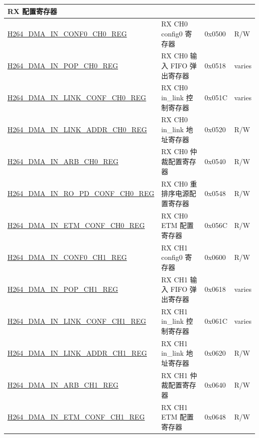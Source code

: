 \begin{longtable}{ | p{7.5cm} | p{5.7cm} | p{1.2cm} | p{1cm} | }
\multicolumn{4}{|l|}{\textbf{RX 配置寄存器}} \\ \hline
    \hyperref[regdesc:H264DMAINCONF0CH0REG]{H264\_DMA\_IN\_CONF0\_CH0\_REG} & RX CH0 config0 寄存器 & 0x0500 & R/W \\ \hline
    \hyperref[regdesc:H264DMAINPOPCH0REG]{H264\_DMA\_IN\_POP\_CH0\_REG} & RX CH0 输入 FIFO 弹出寄存器 & 0x0518 & varies \\ \hline
    \hyperref[regdesc:H264DMAINLINKCONFCH0REG]{H264\_DMA\_IN\_LINK\_CONF\_CH0\_REG} & RX CH0 in\_link 控制寄存器 & 0x051C & varies \\ \hline
    \hyperref[regdesc:H264DMAINLINKADDRCH0REG]{H264\_DMA\_IN\_LINK\_ADDR\_CH0\_REG} & RX CH0 in\_link 地址寄存器 & 0x0520 & R/W \\ \hline
    \hyperref[regdesc:H264DMAINARBCH0REG]{H264\_DMA\_IN\_ARB\_CH0\_REG} & RX CH0 仲裁配置寄存器 & 0x0540 & R/W \\ \hline
    \hyperref[regdesc:H264DMAINROPDCONFCH0REG]{H264\_DMA\_IN\_RO\_PD\_CONF\_CH0\_REG} & RX CH0 重排序电源配置寄存器 & 0x0548 & R/W \\ \hline
    \hyperref[regdesc:H264DMAINETMCONFCH0REG]{H264\_DMA\_IN\_ETM\_CONF\_CH0\_REG} & RX CH0 ETM 配置寄存器 & 0x056C & R/W \\ \hline

    \hyperref[regdesc:H264DMAINCONF0CH1REG]{H264\_DMA\_IN\_CONF0\_CH1\_REG} & RX CH1 config0 寄存器 & 0x0600 & R/W \\ \hline
    \hyperref[regdesc:H264DMAINPOPCH1REG]{H264\_DMA\_IN\_POP\_CH1\_REG} & RX CH1 输入 FIFO 弹出寄存器 & 0x0618 & varies \\ \hline
    \hyperref[regdesc:H264DMAINLINKCONFCH1REG]{H264\_DMA\_IN\_LINK\_CONF\_CH1\_REG} & RX CH1 in\_link 控制寄存器 & 0x061C & varies \\ \hline
    \hyperref[regdesc:H264DMAINLINKADDRCH1REG]{H264\_DMA\_IN\_LINK\_ADDR\_CH1\_REG} & RX CH1 in\_link 地址寄存器 & 0x0620 & R/W \\ \hline
    \hyperref[regdesc:H264DMAINARBCH1REG]{H264\_DMA\_IN\_ARB\_CH1\_REG} & RX CH1 仲裁配置寄存器 & 0x0640 & R/W \\ \hline
    \hyperref[regdesc:H264DMAINETMCONFCH1REG]{H264\_DMA\_IN\_ETM\_CONF\_CH1\_REG} & RX CH1 ETM 配置寄存器 & 0x0648 & R/W \\ \hline


\end{longtable}
